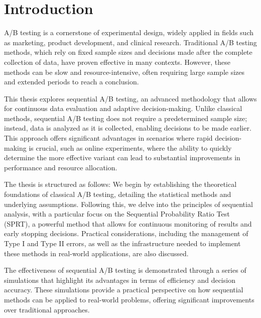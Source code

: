\documentclass[magisterska, english]{pwr_wmat_praca_dyplomowa}
\theoremstyle{plain}
\numberwithin{theorem}{chapter}
\theoremstyle{definition}
\numberwithin{theorem}{chapter}
\begin{document}
\frontmatter
\maketitle
\mainmatter
\tableofcontents

{\backmatter \chapter{Introduction}} 

A/B testing is a cornerstone of experimental design, widely applied in fields such as marketing, product development, and clinical research. Traditional A/B testing methods, which rely on fixed sample sizes and decisions made after the complete collection of data, have proven effective in many contexts. However, these methods can be slow and resource-intensive, often requiring large sample sizes and extended periods to reach a conclusion.

This thesis explores sequential A/B testing, an advanced methodology that allows for continuous data evaluation and adaptive decision-making. Unlike classical methods, sequential A/B testing does not require a predetermined sample size; instead, data is analyzed as it is collected, enabling decisions to be made earlier. This approach offers significant advantages in scenarios where rapid decision-making is crucial, such as online experiments, where the ability to quickly determine the more effective variant can lead to substantial improvements in performance and resource allocation.

The thesis is structured as follows: We begin by establishing the theoretical foundations of classical A/B testing, detailing the statistical methods and underlying assumptions. Following this, we delve into the principles of sequential analysis, with a particular focus on the Sequential Probability Ratio Test (SPRT), a powerful method that allows for continuous monitoring of results and early stopping decisions. Practical considerations, including the management of Type I and Type II errors, as well as the infrastructure needed to implement these methods in real-world applications, are also discussed.

The effectiveness of sequential A/B testing is demonstrated through a series of simulations that highlight its advantages in terms of efficiency and decision accuracy. These simulations provide a practical perspective on how sequential methods can be applied to real-world problems, offering significant improvements over traditional approaches.
\end{document}
